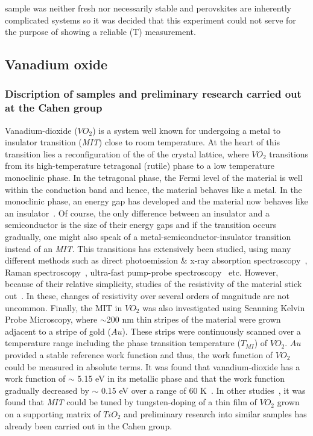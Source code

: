 sample was neither fresh nor necessarily stable and perovskites are inherently complicated systems so it was decided that this experiment could not serve for the purpose of showing a reliable \spv{}(T) measurement.\\

\subsection{Vanadium oxide}
\subsubsection{Discription of samples and preliminary research carried out at the Cahen group}
Vanadium-dioxide ($VO_2$) is a system well known for undergoing a metal to insulator transition (\emph{MIT}) close to room temperature. At the heart of this transition lies a reconfiguration of the of the crystal lattice, where $VO_2$ transitions from its high-temperature tetragonal (rutile) phase to a low temperature monoclinic phase. In the tetragonal phase, the Fermi level of the material is well within the conduction band and hence, the material behaves like a metal. In the monoclinic phase, an energy gap has developed and the material now behaves like an insulator~\cite{nakano_gapopen}. Of course, the only difference between an insulator and a semiconductor is the size of their energy gaps and if the transition occurs gradually, one might also speak of a metal-semiconductor-insulator transition instead of an \emph{MIT}. This transitions has extensively been studied, using many different methods such as direct photoemission \& x-ray absorption spectroscopy~\cite{koethe_expstud}, Raman spectroscopy~\cite{radue_raman}, ultra-fast pump-probe spectroscopy~\cite{jensen_expgap} etc. However, because of their relative simplicity, studies of the resistivity of the material stick out~\cite{shibuya_physlet}. In these, changes of resistivity over several orders of magnitude are not uncommon. Finally, the MIT in $VO_2$ was also investigated using Scanning Kelvin Probe Microscopy, where $\sim$200 nm thin stripes of the material were grown adjacent to a stripe of gold ($Au$). These strips were continuously scanned over a temperature range including the phase transition temperature ($T_{MI}$) of $VO_2$. $Au$ provided a stable reference work function and thus, the work function of $VO_2$ could be measured in absolute terms. It was found that vanadium-dioxide has a work function of $\sim$ 5.15 eV in its metallic phase and that the work function gradually decreased by $\sim$ 0.15 eV over a range of 60 K~\cite{ko_kp}. In other studies~\cite{shibuya_physrev}, it was found that \emph{MIT} could be tuned by tungsten-doping of a thin film of $VO_2$ grown on a supporting matrix of $TiO_2$ and preliminary research into similar samples has already been carried out in the Cahen group.\\
